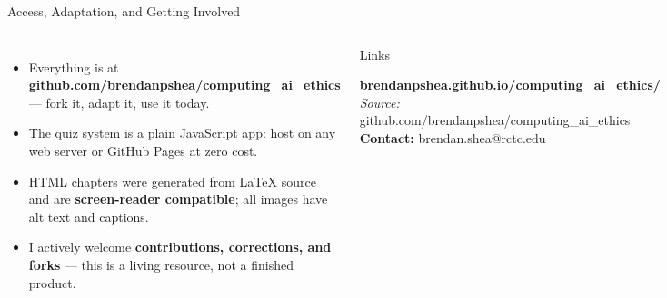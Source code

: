 \documentclass[aspectratio=169,10pt]{beamer}
\begin{document}
\begin{frame}{Access, Adaptation, and Getting Involved}
\begin{columns}[c]
\begin{itemize}
  \item Everything is at \textbf{github.com/brendanpshea/\allowbreak computing\_ai\_ethics} --- fork it, adapt it, use it today.
  \item The quiz system is a plain JavaScript app: host on any web server or GitHub Pages at zero cost.
  \item HTML chapters were generated from \LaTeX{} source and are \textbf{screen-reader compatible}; all images have alt text and captions.
  \item I actively welcome \textbf{contributions, corrections, and forks} --- this is a living resource, not a finished product.
\end{itemize}
\begin{block}{Links}
\footnotesize
\centering
{}\par\vspace{0.25em}
\textbf{brendanpshea.github.io/\allowbreak computing\_ai\_ethics/}\\[0.3em]
\textit{Source:} github.com/brendanpshea/\allowbreak computing\_ai\_ethics\\[0.2em]
\textbf{Contact:} brendan.shea@rctc.edu
\end{block}
\end{columns}
\end{frame}
\end{document}
